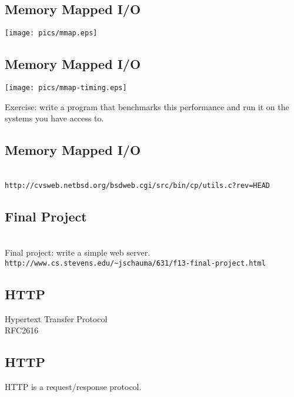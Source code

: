 \documentclass[xga]{xdvislides}
\begin{document}
\subsection{Memory Mapped I/O}
\begin{center}
	\texttt{[image: pics/mmap.eps]}
\end{center}

\subsection{Memory Mapped I/O}
\begin{center}
	\texttt{[image: pics/mmap-timing.eps]}
\end{center}
\addvspace{.5in}
Exercise: write a program that benchmarks this performance and run it on
the systems you have access to.

\subsection{Memory Mapped I/O}
\\
\vspace*{\fill}
\verb+http://cvsweb.netbsd.org/bsdweb.cgi/src/bin/cp/utils.c?rev=HEAD+
\vspace*{\fill}

\subsection{Final Project}
\\
\vspace*{\fill}
Final project: write a simple web server. \\
{\tt http://www.cs.stevens.edu/\~{}jschauma/631/f13-final-project.html}
\vspace*{\fill}

\subsection{HTTP}
\vspace{.5in}
\begin{center}
	\Huge
	Hypertext Transfer Protocol
	\\
	\vspace{.5in}
	RFC2616
\end{center}
\Normalsize

\subsection{HTTP}
\vspace{.5in}
\begin{center}
	\Huge
	HTTP is a request/response protocol.
\end{center}
\Normalsize
\end{document}
